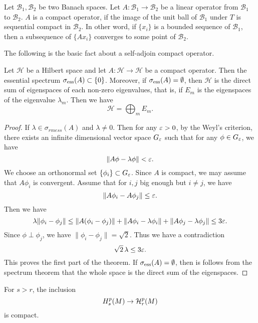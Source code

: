 \begin{definition}
Let $\mathcal B_1,\mathcal B_2$ be two Banach spaces.
Let $A: \mathcal B_1\rightarrow\mathcal B_2$ be a linear
operator from $\mathcal B_1$ to $\mathcal B_2$. $A$ is a
compact
operator, if the image of the unit ball of $\mathcal B_1$
under $T$
is sequential compact in $\mathcal B_2$. In other word, if
$\{x_i\}$ is a bounded sequence of $\mathcal B_1$,
then  a subsequence of $\{Ax_i\}$ converges to some point
of $\mathcal B_2$.
\end{definition}

The following is the basic fact about a self-adjoin compact operator. 

\begin{theorem}
Let $\mathcal H$ be a Hilbert space and let $A: \mathcal H\to\mathcal H$ be  a compact operator. Then the essential spectrum 
$\sigma_{\rm ess}(A)\subset\{0\}$. Moreover, if $\sigma_{\rm ess}(A)=\emptyset$, then $\mathcal H$ is the direct sum of eigenspaces of each non-zero eigenvalues, that is, if $E_m$ is the eigenspaces of the eigenvalue $\lambda_m$. Then we have
\[
\mathcal H=\bigoplus_m E_m.
\]
\end{theorem}

\begin{proof}
If $\lambda\in\sigma_{rm ess}(A)$ and $\lambda\neq 0$. Then for any $\varepsilon>0$, by the Weyl's criterion, there exists an infinite dimensional vector space $G_\varepsilon$ such that for any $\phi\in G_\varepsilon$, we have
\[
\|A\phi-\lambda\phi\|<\varepsilon.
\]
We choose an orthonormal set $\{\phi_i\}\subset G_\varepsilon$. Since $A$ is compact, we may assume that $A\phi_i$ is convergent. Assume that for $i,j$ big enough but $i\neq j$, we have
\[
\|A\phi_i-A\phi_j\|\leq \varepsilon.
\]
Then we have
\[
\lambda\|\phi_i-\phi_j\|\leq \|A(\phi_i-\phi_j)\|+\|A\phi_i-\lambda\phi_i\|+\|A\phi_j-\lambda\phi_j\|\leq 3\varepsilon.
\]
Since $\phi\perp\phi_j$, we have $\|\phi_i-\phi_j\|=\sqrt 2$. Thus we have a contradiction 
\[
\sqrt 2\,\lambda\leq 3\varepsilon.
\]
This proves the first part of the theorem. If $\sigma_{\rm ess}(A)=\emptyset$, then is follows from the spectrum  theorem that the whole space is the direct sum of the eigenspaces. 

\end{proof}

\begin{theorem}  
For $s>r$, the inclusion
\[
\mathcal \mathcal H_s^p(M) \rightarrow \mathcal H^{p}_r (M)
\]
is compact.
\end{theorem}

